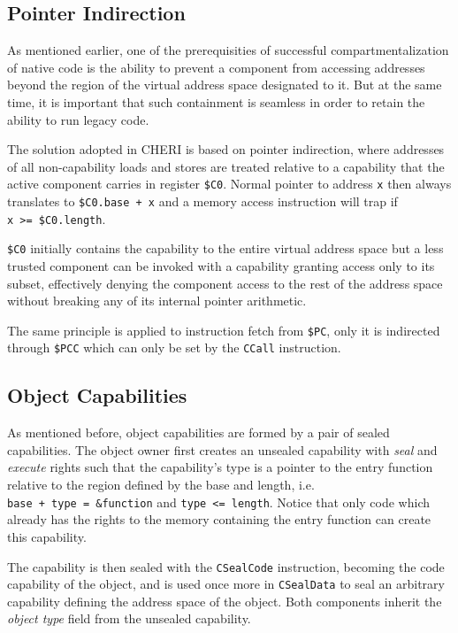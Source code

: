 \documentclass[a4paper,12pt,twoside,openright]{report}
\newcommand{\reg}[1]{\texttt{\$#1}}
\newcommand{\insn}[1]{\texttt{#1}}
\begin{document}
\subsection{Pointer Indirection}

As mentioned earlier, one of the prerequisities of successful compartmentalization of native code is the ability to prevent a component from accessing addresses beyond the region of the virtual address space designated to it. But at the same time, it is important that such containment is seamless in order to retain the ability to run legacy code.

The solution adopted in CHERI is based on pointer indirection, where addresses of all non-capability loads and stores are treated relative to a capability that the active component carries in register \reg{C0}. Normal pointer to address \texttt{x} then always translates to \texttt{\reg{C0}.base~+~x} and a memory access instruction will trap if \texttt{x~>=~\reg{C0}.length}. 

\reg{C0} initially contains the capability to the entire virtual address space but a less trusted component can be invoked with a capability granting access only to its subset, effectively denying the component access to the rest of the address space without breaking any of its internal pointer arithmetic.

The same principle is applied to instruction fetch from \reg{PC}, only it is indirected through \reg{PCC} which can only be set by the \insn{CCall} instruction.

\subsection{Object Capabilities}

As mentioned before, object capabilities are formed by a pair of sealed capabilities. The object owner first creates an unsealed capability with \emph{seal} and \emph{execute} rights such that the capability's type is a pointer to the entry function relative to the region defined by the base and length, i.e. \texttt{base~+~type~=~\&function} and \texttt{type~<=~length}. Notice that only code which already has the rights to the memory containing the entry function can create this capability. 

The capability is then sealed with the \insn{CSealCode} instruction, becoming the code capability of the object, and is used once more in \insn{CSealData} to seal an arbitrary capability defining the address space of the object. Both components inherit the \emph{object type} field from the unsealed capability.
\end{document}
